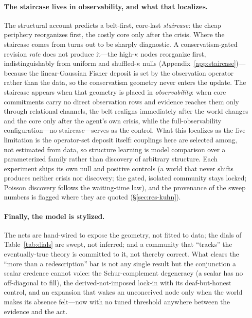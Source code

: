 \documentclass[11pt]{article}
\begin{document}
\paragraph{The staircase lives in observability, and what that localizes.}
The structural account predicts a belt-first, core-last \emph{staircase}: the cheap periphery
reorganizes first, the costly core only after the crisis. Where the staircase comes from turns out
to be sharply diagnostic. A conservatism-gated revision \emph{rate} does not produce it---the
high-$\kappa$ nodes reorganize first, indistinguishably from uniform and shuffled-$\kappa$ nulls
(Appendix~\ref{app:staircase})---because the linear-Gaussian Fisher deposit is set by the
observation operator rather than the data, so the conservatism geometry never enters the update.
The staircase appears when that geometry is placed in \emph{observability}: when core commitments
carry no direct observation rows and evidence reaches them only through relational channels, the
belt realigns immediately after the world changes and the core only after the agent's own crisis,
while the full-observability configuration---no staircase---serves as the control. What this
localizes as the live limitation is the operator-set deposit itself: couplings here are selected
among, not estimated from data, so structure learning is model comparison over a parameterized
family rather than discovery of arbitrary structure. Each experiment ships its own null and
positive controls (a world that never shifts produces neither crisis nor discovery; the gated,
isolated community stays locked; Poisson discovery follows the waiting-time law), and the
provenance of the sweep numbers is flagged where they are quoted (\S\ref{sec:res-kuhn}).

\paragraph{Finally, the model is stylized.}
The nets are hand-wired to expose the geometry, not fitted to data; the dials of
Table~\ref{tab:dials} are swept, not inferred; and a community that ``tracks'' the eventually-true
theory is committed to it, not thereby correct. What clears the ``more than a redescription'' bar
is not any single result but the conjunction a scalar credence cannot voice: the Schur-complement
degeneracy (a scalar has no off-diagonal to fill), the derived-not-imposed lock-in with its
deaf-but-honest control, and an expansion that wakes an unconceived node only when the world makes
its absence felt---now with no tuned threshold anywhere between the evidence and the act.
\end{document}
